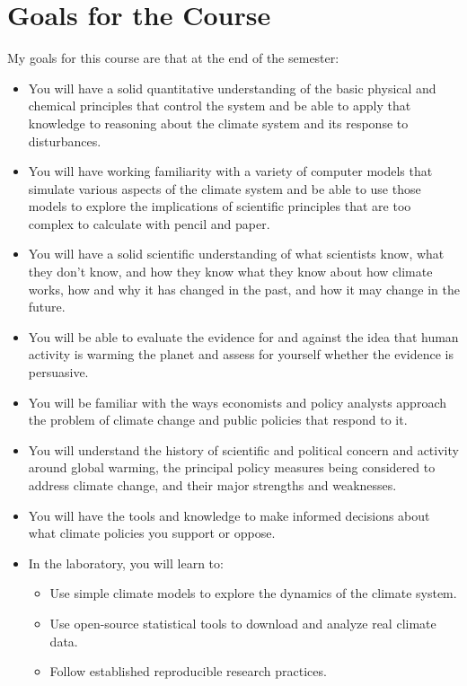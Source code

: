 \documentclass[11pt,twoside]{jgsyllabus}\usepackage[]{graphicx}\usepackage[]{color}
\begin{document}
\section[Goals]{Goals for the Course}
My goals for this course are that at the end of the semester:
\begin{itemize}
\item You will have a solid quantitative understanding of the basic physical and chemical principles
that control the system and be able to apply that knowledge to reasoning about the climate system and its response to disturbances.
\item You will have working familiarity with a variety of computer models that simulate various aspects of the climate system
and be able to use those models to explore the implications of scientific principles that are too complex to calculate with pencil and paper.
\item You will have a solid scientific understanding of what scientists know, what they don't know,
and how they know what they know about how climate works, how and why it has changed in the past,
and how it may change in the future.
\item You will be able to evaluate the evidence for and against the idea that human
activity is warming the planet and assess for yourself whether the evidence is persuasive.
\item You will be familiar with the ways economists and policy analysts
approach the problem of climate change and public policies that respond to it.
\item You will understand the history of scientific and political concern and activity
around global warming, the principal policy measures being considered to address
climate change, and their major strengths and weaknesses.
\item You will have the tools and knowledge to make informed decisions about what
climate policies you support or oppose.
\item In the laboratory, you will learn to:
\begin{itemize}
\item Use simple climate models to explore the dynamics of the climate system.
\item Use open-source statistical tools to download and analyze real climate data.
\item Follow established reproducible research practices.
\end{itemize}
\end{itemize}
\end{document}
